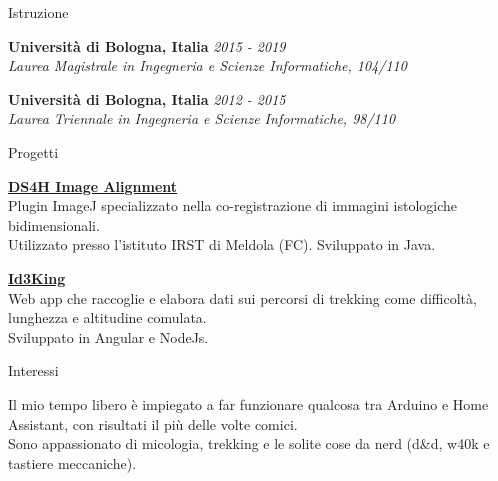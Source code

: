 \documentclass{../resume} %
\begin{document}
\begin{rSection}{Istruzione}

{\bf Università di Bologna, Italia } \hfill {\em 2015 - 2019} 
\\{ \textit {Laurea Magistrale in Ingegneria e Scienze Informatiche, 104/110 }} 

{\bf Università di Bologna, Italia } \hfill {\em 2012 - 2015} 
\\ { \textit {Laurea Triennale in Ingegneria e Scienze Informatiche, 98/110 }} \hfill


\end{rSection}


\begin{rSection}{Progetti}

{\bf \href{https://imagej.net/plugins/ds4h-image-alignment}{DS4H Image Alignment}}
\\ Plugin ImageJ specializzato nella co-registrazione di immagini istologiche bidimensionali.\\
Utilizzato presso l'istituto IRST di Meldola (FC). Sviluppato in Java.

{\bf \href{https://github.com/illeb/id3king}{Id3King}}
\\ Web app che raccoglie e elabora dati sui percorsi di trekking come difficoltà, lunghezza e altitudine comulata.\\
Sviluppato in Angular e NodeJs.

\end{rSection}


\begin{rSection}{Interessi}

  Il mio tempo libero è impiegato a far funzionare qualcosa tra Arduino e Home Assistant, con risultati il più delle volte comici.\\ Sono appassionato di micologia, trekking e le solite cose da nerd (d\&d, w40k e tastiere meccaniche).
\end{rSection}
\end{document}
